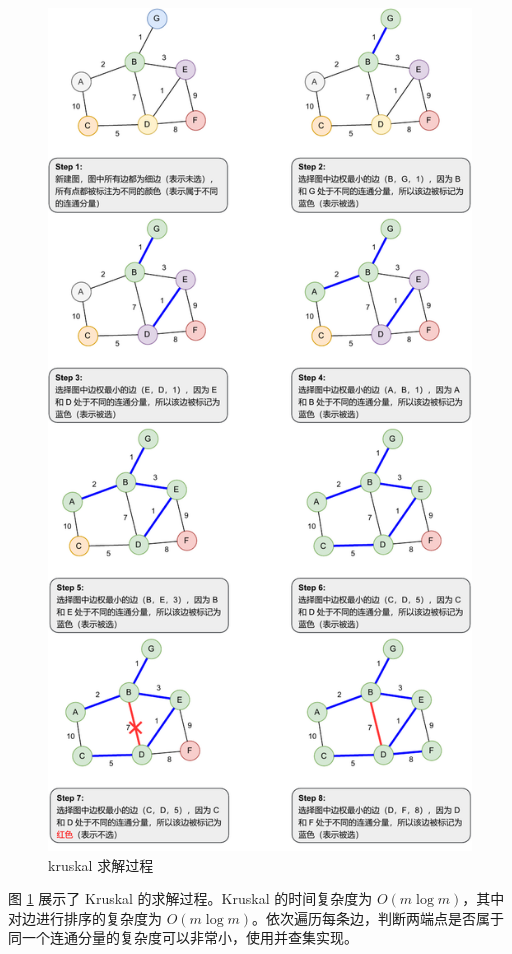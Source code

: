 \documentclass[12pt,a4paper]{article}
\begin{document}
\begin{figure}
    \centering
    \includegraphics[width=12cm]{img/lab6/kruskal.pdf}
    \caption{kruskal 求解过程}
    \label{fig:kruskal}
\end{figure}


图 \ref{fig:kruskal} 展示了 Kruskal 的求解过程。Kruskal 的时间复杂度为 $O(m\log m)$，其中对边进行排序的复杂度为 $O(m\log m)$。依次遍历每条边，判断两端点是否属于同一个连通分量的复杂度可以非常小，使用并查集实现。
\end{document}
